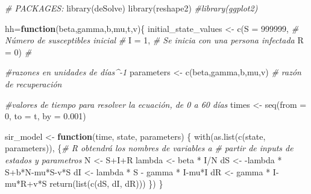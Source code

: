 \documentclass[
]{article}
\newenvironment{Shaded}{\begin{snugshade}}{\end{snugshade}}
\newcommand{\AttributeTok}[1]{\textcolor[rgb]{0.77,0.63,0.00}{#1}}
\newcommand{\CommentTok}[1]{\textcolor[rgb]{0.56,0.35,0.01}{\textit{#1}}}
\newcommand{\ControlFlowTok}[1]{\textcolor[rgb]{0.13,0.29,0.53}{\textbf{#1}}}
\newcommand{\DecValTok}[1]{\textcolor[rgb]{0.00,0.00,0.81}{#1}}
\newcommand{\FloatTok}[1]{\textcolor[rgb]{0.00,0.00,0.81}{#1}}
\newcommand{\FunctionTok}[1]{\textcolor[rgb]{0.00,0.00,0.00}{#1}}
\newcommand{\NormalTok}[1]{#1}
\newcommand{\OtherTok}[1]{\textcolor[rgb]{0.56,0.35,0.01}{#1}}
\newcommand{\SpecialCharTok}[1]{\textcolor[rgb]{0.00,0.00,0.00}{#1}}
\begin{document}
\begin{Shaded}
\begin{Highlighting}[]
\CommentTok{\# PACKAGES:}
\FunctionTok{library}\NormalTok{(deSolve)}
\FunctionTok{library}\NormalTok{(reshape2)}
\CommentTok{\#library(ggplot2)}

\NormalTok{hh}\OtherTok{=}\ControlFlowTok{function}\NormalTok{(beta,gamma,b,mu,t,v)\{}
\NormalTok{initial\_state\_values }\OtherTok{\textless{}{-}} \FunctionTok{c}\NormalTok{(}\AttributeTok{S =} \DecValTok{999999}\NormalTok{,  }\CommentTok{\# Número de susceptibles inicial}
                                       \CommentTok{\# }
                          \AttributeTok{I =} \DecValTok{1}\NormalTok{,       }\CommentTok{\# Se inicia con una persona infectada}
                          \AttributeTok{R =} \DecValTok{0}\NormalTok{)       }\CommentTok{\# }


\CommentTok{\#razones en unidades de días\^{}{-}1}
\NormalTok{parameters }\OtherTok{\textless{}{-}} \FunctionTok{c}\NormalTok{(beta,gamma,b,mu,v)   }\CommentTok{\# razón de recuperación}

\CommentTok{\#valores de tiempo para resolver la ecuación, de 0 a 60 días}
\NormalTok{times }\OtherTok{\textless{}{-}} \FunctionTok{seq}\NormalTok{(}\AttributeTok{from =} \DecValTok{0}\NormalTok{, }\AttributeTok{to =}\NormalTok{ t, }\AttributeTok{by =} \FloatTok{0.001}\NormalTok{)   }

\NormalTok{sir\_model }\OtherTok{\textless{}{-}} \ControlFlowTok{function}\NormalTok{(time, state, parameters) \{  }
    \FunctionTok{with}\NormalTok{(}\FunctionTok{as.list}\NormalTok{(}\FunctionTok{c}\NormalTok{(state, parameters)), \{}\CommentTok{\# R obtendrá los nombres de variables a}
                                         \CommentTok{\# partir de inputs de estados y parametros}
\NormalTok{        N }\OtherTok{\textless{}{-}}\NormalTok{ S}\SpecialCharTok{+}\NormalTok{I}\SpecialCharTok{+}\NormalTok{R }
\NormalTok{        lambda }\OtherTok{\textless{}{-}}\NormalTok{ beta }\SpecialCharTok{*}\NormalTok{ I}\SpecialCharTok{/}\NormalTok{N}
\NormalTok{        dS }\OtherTok{\textless{}{-}} \SpecialCharTok{{-}}\NormalTok{lambda }\SpecialCharTok{*}\NormalTok{ S}\SpecialCharTok{+}\NormalTok{b}\SpecialCharTok{*}\NormalTok{N}\SpecialCharTok{{-}}\NormalTok{mu}\SpecialCharTok{*}\NormalTok{S}\SpecialCharTok{{-}}\NormalTok{v}\SpecialCharTok{*}\NormalTok{S           }
\NormalTok{        dI }\OtherTok{\textless{}{-}}\NormalTok{ lambda }\SpecialCharTok{*}\NormalTok{ S }\SpecialCharTok{{-}}\NormalTok{ gamma }\SpecialCharTok{*}\NormalTok{ I}\SpecialCharTok{{-}}\NormalTok{mu}\SpecialCharTok{*}\NormalTok{I }
\NormalTok{        dR }\OtherTok{\textless{}{-}}\NormalTok{ gamma }\SpecialCharTok{*}\NormalTok{ I}\SpecialCharTok{{-}}\NormalTok{mu}\SpecialCharTok{*}\NormalTok{R}\SpecialCharTok{+}\NormalTok{v}\SpecialCharTok{*}\NormalTok{S         }
        \FunctionTok{return}\NormalTok{(}\FunctionTok{list}\NormalTok{(}\FunctionTok{c}\NormalTok{(dS, dI, dR))) }
\NormalTok{    \})}
\NormalTok{\}}


\end{Highlighting}
\end{Shaded}
\end{document}
